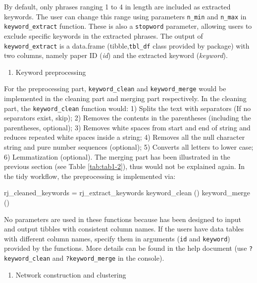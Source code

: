 By default, only phrases ranging 1 to 4 in length are included as
extracted keywords. The user can change this range using parameters
\texttt{n\_min} and \texttt{n\_max} in \texttt{keyword\_extract}
function. These is also a \texttt{stopword} parameter, allowing users to
exclude specific keywords in the extracted phrases. The output of
\texttt{keyword\_extract} is a data.frame (tibble,\texttt{tbl\_df} class
provided by  package) with two columns, namely paper ID
(\emph{id}) and the extracted keyword (\emph{keyword}).

\begin{enumerate}
\def\labelenumi{(\arabic{enumi})}
\setcounter{enumi}{1}
\tightlist
\item
  Keyword preprocessing
\end{enumerate}

For the preprocessing part, \texttt{keyword\_clean} and
\texttt{keyword\_merge} would be implemented in the cleaning part and
merging part respectively. In the cleaning part, the
\texttt{keyword\_clean} function would: 1) Splits the text with
separators (If no separators exist, skip); 2) Removes the contents in
the parentheses (including the parentheses, optional); 3) Removes white
spaces from start and end of string and reduces repeated white spaces
inside a string; 4) Removes all the null character string and pure
number sequences (optional); 5) Converts all letters to lower case; 6)
Lemmatization (optional). The merging part has been illustrated in the
previous section (see Table \ref{tab:tab1-2}), thus would not be
explained again. In the tidy workflow, the preprocessing is implemented
via:

\begin{Schunk}
\begin{Sinput}
rj_cleaned_keywords = rj_extract_keywords %
  keyword_clean () %
  keyword_merge ()
\end{Sinput}
\end{Schunk}

No parameters are used in these functions because  has been
designed to input and output tibbles with consistent column names. If
the users have data tables with different column names, specify them in
arguments (\texttt{id} and \texttt{keyword}) provided by the functions.
More details can be found in the help document (use
\texttt{?keyword\_clean} and \texttt{?keyword\_merge} in the console).

\begin{enumerate}
\def\labelenumi{(\arabic{enumi})}
\setcounter{enumi}{2}
\tightlist
\item
  Network construction and clustering
\end{enumerate}

